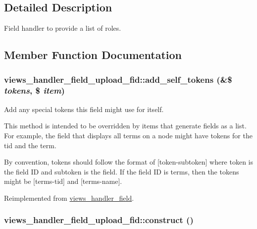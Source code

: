 \subsection{Detailed Description}
Field handler to provide a list of roles. 

\subsection{Member Function Documentation}
\hypertarget{classviews__handler__field__upload__fid_0366e80867739ae07af5ee910d3022be}{
\subsubsection[{add\_\-self\_\-tokens}]{\setlength{\rightskip}{0pt plus 5cm}views\_\-handler\_\-field\_\-upload\_\-fid::add\_\-self\_\-tokens (\&\$ {\em tokens}, \/  \$ {\em item})}}
\label{classviews__handler__field__upload__fid_0366e80867739ae07af5ee910d3022be}


Add any special tokens this field might use for itself.

This method is intended to be overridden by items that generate fields as a list. For example, the field that displays all terms on a node might have tokens for the tid and the term.

By convention, tokens should follow the format of \mbox{[}token-subtoken\mbox{]} where token is the field ID and subtoken is the field. If the field ID is terms, then the tokens might be \mbox{[}terms-tid\mbox{]} and \mbox{[}terms-name\mbox{]}. 

Reimplemented from \hyperlink{classviews__handler__field_c61cc83a4c8c579993a254b5b1e16cbc}{views\_\-handler\_\-field}.\hypertarget{classviews__handler__field__upload__fid_e651b7971cdda48c84d470f5c86cf492}{
\subsubsection[{construct}]{\setlength{\rightskip}{0pt plus 5cm}views\_\-handler\_\-field\_\-upload\_\-fid::construct ()}}
\label{classviews__handler__field__upload__fid_e651b7971cdda48c84d470f5c86cf492}


